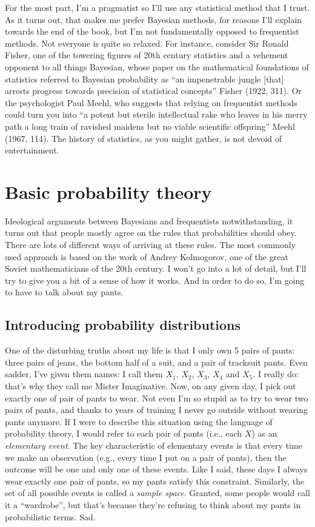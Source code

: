 \documentclass[
  letterpaper,
  DIV=11,
  numbers=noendperiod]{scrreprt}
\begin{document}
For the most part, I'm a pragmatist so I'll use any statistical method
that I trust. As it turns out, that makes me prefer Bayesian methods,
for reasons I'll explain towards the end of the book, but I'm not
fundamentally opposed to frequentist methods. Not everyone is quite so
relaxed. For instance, consider Sir Ronald Fisher, one of the towering
figures of 20th century statistics and a vehement opponent to all things
Bayesian, whose paper on the mathematical foundations of statistics
referred to Bayesian probability as ``an impenetrable jungle {[}that{]}
arrests progress towards precision of statistical concepts'' Fisher
(1922, 311). Or the psychologist Paul Meehl, who suggests that relying
on frequentist methods could turn you into ``a potent but sterile
intellectual rake who leaves in his merry path a long train of ravished
maidens but no viable scientific offspring'' Meehl (1967, 114). The
history of statistics, as you might gather, is not devoid of
entertainment.

\section{Basic probability theory}\label{basic-probability-theory}

Ideological arguments between Bayesians and frequentists
notwithstanding, it turns out that people mostly agree on the rules that
probabilities should obey. There are lots of different ways of arriving
at these rules. The most commonly used approach is based on the work of
Andrey Kolmogorov, one of the great Soviet mathematicians of the 20th
century. I won't go into a lot of detail, but I'll try to give you a bit
of a sense of how it works. And in order to do so, I'm going to have to
talk about my pants.

\subsection{Introducing probability
distributions}\label{introducing-probability-distributions}

One of the disturbing truths about my life is that I only own 5 pairs of
pants: three pairs of jeans, the bottom half of a suit, and a pair of
tracksuit pants. Even sadder, I've given them names: I call them
\(X_1\), \(X_2\), \(X_3\), \(X_4\) and \(X_5\). I really do: that's why
they call me Mister Imaginative. Now, on any given day, I pick out
exactly one of pair of pants to wear. Not even I'm so stupid as to try
to wear two pairs of pants, and thanks to years of training I never go
outside without wearing pants anymore. If I were to describe this
situation using the language of probability theory, I would refer to
each pair of pants (i.e., each \(X\)) as an \emph{elementary event}. The
key characteristic of elementary events is that every time we make an
observation (e.g., every time I put on a pair of pants), then the
outcome will be one and only one of these events. Like I said, these
days I always wear exactly one pair of pants, so my pants satisfy this
constraint. Similarly, the set of all possible events is called a
\emph{sample space}. Granted, some people would call it a ``wardrobe'',
but that's because they're refusing to think about my pants in
probabilistic terms. Sad.
\end{document}

